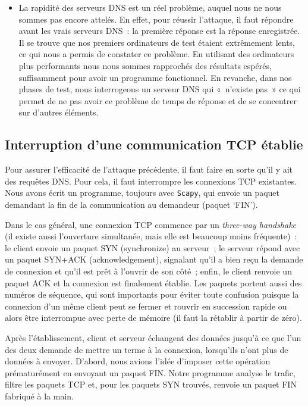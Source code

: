 \documentclass[a4paper, 12pt,twoside]{article}
\begin{document}
\begin{itemize}[label=\color{bleu303}\textbullet{}]
                \item La rapidité des serveurs DNS est un réel problème, auquel nous ne nous sommes pas encore attelés. En effet, pour réussir l'attaque, il faut répondre avant les vrais serveurs DNS~: la première réponse est la réponse enregistrée. Il se trouve que nos premiers ordinateurs de test étaient extrêmement lents, ce qui nous a permis de constater ce problème. En utilisant des ordinateurs plus performants nous nous sommes rapprochés des résultats espérés, suffisamment pour avoir un programme fonctionnel. En revanche, dans nos phases de test, nous interrogeons un serveur DNS qui «~n'existe pas~» ce qui permet de ne pas avoir ce problème de temps de réponse et de se concentrer sur d'autres éléments.
            \end{itemize}

        \subsection{Interruption d'une communication TCP établie}\label{tcpstop}

            Pour assurer l'efficacité de l'attaque précédente, il faut faire en sorte qu'il y ait des requêtes DNS. Pour cela, il faut interrompre les connexions TCP existantes. Nous avons écrit un programme, toujours avec \verb!Scapy!, qui envoie un paquet demandant la fin de la communication au demandeur (paquet ‘FIN').

            Dans le cas général, une connexion TCP commence par un \emph{three-way handshake} (il existe aussi l'ouverture simultanée, mais elle est beaucoup moins fréquente)~: le client envoie un paquet SYN (synchronize) au serveur~; le serveur répond avec un paquet SYN+ACK (acknowledgement), signalant qu'il a bien reçu la demande de connexion et qu'il est prêt à l'ouvrir de son côté~; enfin, le client renvoie un paquet ACK et la connexion est finalement établie. Les paquets portent aussi des numéros de séquence, qui sont importants pour éviter toute confusion puisque la connexion d'un même client peut se fermer et rouvrir en succession rapide ou alors être interrompue avec perte de mémoire (il faut la rétablir à partir de zéro).

            Après l'établissement, client et serveur échangent des données jusqu'à ce que l'un des deux demande de mettre un terme à la connexion, lorsqu'ils n'ont plus de données à envoyer. D'abord, nous avions l'idée d'imposer cette opération prématurément en envoyant un paquet FIN. Notre programme analyse le trafic, filtre les paquets TCP et, pour les paquets SYN trouvés, renvoie un paquet FIN fabriqué à la main.
\end{document}

